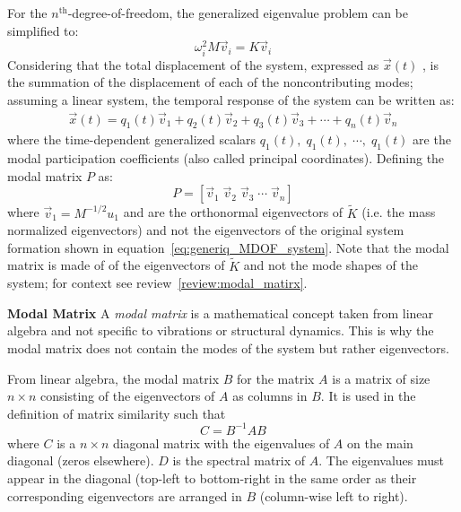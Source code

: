 \documentclass[12pt,letter]{article}
\begin{document}
	For the $n^{\text{th}}$-degree-of-freedom, the generalized eigenvalue problem can be simplified to: 
	\begin{equation}
	\omega_i^2 M \vec{v}_i = K  \vec{v}_i
	\end{equation}
	Considering that the total displacement of the system, expressed as $\vec{x}(t)$ , is the summation of the displacement of each of the noncontributing modes; assuming a linear system, the temporal response of the system can be written as:
	\begin{eqnarray}
	\vec{x}(t) = q_1(t) \vec{v}_1 + q_2(t) \vec{v}_2 + q_3(t) \vec{v}_3 + \cdots + q_n(t) \vec{v}_n
	\label{eq:combination_of_modes}
	\end{eqnarray}
	\noindent where the time-dependent generalized scalars $q_1(t), \; q_1(t), \; \cdots, \; q_1(t)$ are the modal participation coefficients (also called principal coordinates). Defining the modal matrix $P$ as: 
	\begin{equation}
	P = [ \vec{v}_1 \;  \vec{v}_2 \;  \vec{v}_3 \; \cdots \; \vec{v}_n]
	\end{equation}
	where $\vec{v}_1 = M^{-1/2}u_1$ and are the orthonormal eigenvectors of $\tilde{K}$ (i.e. the mass normalized eigenvectors) and not the eigenvectors of the original system formation shown in equation~\ref{eq:generiq_MDOF_system}. Note that the modal matrix is made of of the eigenvectors of $\tilde{K}$ and not the mode shapes of the system; for context see review~\ref{review:modal_matirx}.

		\begin{review}	
		\label{review:modal_matirx}
		\textbf{Modal Matrix} 
			A \emph{modal matrix} is a mathematical concept taken from linear algebra and not specific to vibrations or structural dynamics. This is why the modal matrix does not contain the modes of the system but rather eigenvectors. 
			
			From linear algebra, the modal matrix $B$ for the matrix $A$ is a matrix of size $n \times n$ consisting of the eigenvectors of $A$ as columns in $B$. It is used in the definition of matrix similarity such that 
			\begin{equation}
			C = B^{-1}AB
			\end{equation}
			where $C$ is a $n \times n$ diagonal matrix with the eigenvalues of $A$ on the main diagonal (zeros elsewhere). $D$ is the spectral matrix of $A$. The eigenvalues must appear in the diagonal (top-left to bottom-right in the same order as their corresponding eigenvectors are arranged in $B$ (column-wise left to right).			
		\end{review}	
	
\end{document}
